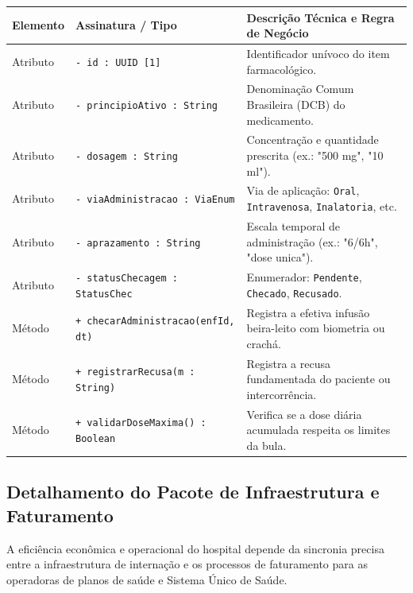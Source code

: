 \begingroup
\small
\noindent\begin{tabularx}{\linewidth}{l >{\raggedright\arraybackslash}p{5.7cm} >{\raggedright\arraybackslash}X}
\toprule
\textbf{Elemento} & \textbf{Assinatura / Tipo} & \textbf{Descrição Técnica e Regra de Negócio} \\
\midrule
Atributo & \texttt{- id : UUID [1]} & Identificador unívoco do item farmacológico. \\
Atributo & \texttt{- principioAtivo : String} & Denominação Comum Brasileira (DCB) do medicamento. \\
Atributo & \texttt{- dosagem : String} & Concentração e quantidade prescrita (ex.: "500 mg", "10 ml"). \\
Atributo & \texttt{- viaAdministracao : ViaEnum} & Via de aplicação: \texttt{Oral}, \texttt{Intravenosa}, \texttt{Inalatoria}, etc. \\
Atributo & \texttt{- aprazamento : String} & Escala temporal de administração (ex.: "6/6h", "dose unica"). \\
Atributo & \texttt{- statusChecagem : StatusChec} & Enumerador: \texttt{Pendente}, \texttt{Checado}, \texttt{Recusado}. \\
\midrule
Método & \texttt{+ checarAdministracao(enfId, dt)} & Registra a efetiva infusão beira-leito com biometria ou crachá. \\
Método & \texttt{+ registrarRecusa(m : String)} & Registra a recusa fundamentada do paciente ou intercorrência. \\
Método & \texttt{+ validarDoseMaxima() : Boolean} & Verifica se a dose diária acumulada respeita os limites da bula. \\
\bottomrule
\end{tabularx}
\endgroup

\subsection{Detalhamento do Pacote de Infraestrutura e Faturamento}
\label{subsec:detalhe_infra_faturamento}

A eficiência econômica e operacional do hospital depende da sincronia precisa entre a infraestrutura de internação e os processos de faturamento para as operadoras de planos de saúde e Sistema Único de Saúde.

